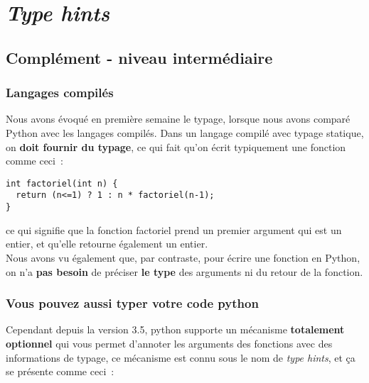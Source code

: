     \hypertarget{type-hints}{%
\section{\texorpdfstring{\emph{Type
hints}}{Type hints}}\label{type-hints}}

    \hypertarget{compluxe9ment---niveau-intermuxe9diaire}{%
\subsection{Complément - niveau
intermédiaire}\label{compluxe9ment---niveau-intermuxe9diaire}}

    \hypertarget{langages-compiluxe9s}{%
\subsubsection{Langages compilés}\label{langages-compiluxe9s}}

    Nous avons évoqué en première semaine le typage, lorsque nous avons
comparé Python avec les langages compilés. Dans un langage compilé avec
typage statique, on \textbf{doit fournir du typage}, ce qui fait qu'on
écrit typiquement une fonction comme ceci~:

\begin{verbatim}
int factoriel(int n) {
  return (n<=1) ? 1 : n * factoriel(n-1);
}
\end{verbatim}

ce qui signifie que la fonction factoriel prend un premier argument qui
est un entier, et qu'elle retourne également un entier.\\

    Nous avons vu également que, par contraste, pour écrire une fonction en
Python, on n'a \textbf{pas besoin} de préciser \textbf{le type} des
arguments ni du retour de la fonction.

    \hypertarget{vous-pouvez-aussi-typer-votre-code-python}{%
\subsubsection{Vous pouvez aussi typer votre code
python}\label{vous-pouvez-aussi-typer-votre-code-python}}

    Cependant depuis la version 3.5, python supporte un mécanisme
\textbf{totalement optionnel} qui vous permet d'annoter les arguments
des fonctions avec des informations de typage, ce mécanisme est connu
sous le nom de \emph{type hints}, et ça se présente comme ceci~:

